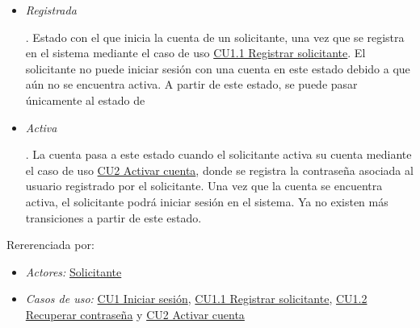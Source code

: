 		\begin{itemize}

			\item \hypertarget{cv:cs:edo:Registrada}{\textit{Registrada}}. Estado con el que inicia la cuenta de un solicitante, una vez que se registra en el sistema mediante el caso de uso \hyperlink{CU1.1}{CU1.1 Registrar solicitante}. El solicitante no puede iniciar sesión con una cuenta en este estado debido a que aún no se encuentra activa. A partir de este estado, se puede pasar únicamente al estado de

			\item \hypertarget{cv:cs:edo:Registrada}{\textit{Activa}}. La cuenta pasa a este estado cuando el solicitante activa su cuenta mediante el caso de uso \hyperlink{CU2}{CU2 Activar cuenta}, donde se registra la contraseña asociada al usuario registrado por el solicitante. Una vez que la cuenta se encuentra activa, el solicitante podrá iniciar sesión en el sistema. Ya no existen más transiciones a partir de este estado.

		\end{itemize}

		\noindent Rererenciada por: 
		
			\begin{itemize}

				\item \textit{Actores:} \hyperlink{A:Solicitante}{Solicitante}

				\item \textit{Casos de uso:} \hyperlink{CU1}{CU1 Iniciar sesión}, \hyperlink{CU1.1}{CU1.1 Registrar solicitante}, \hyperlink{CU1.2}{CU1.2 Recuperar contraseña} y \hyperlink{CU2}{CU2 Activar cuenta}

			\end{itemize}

